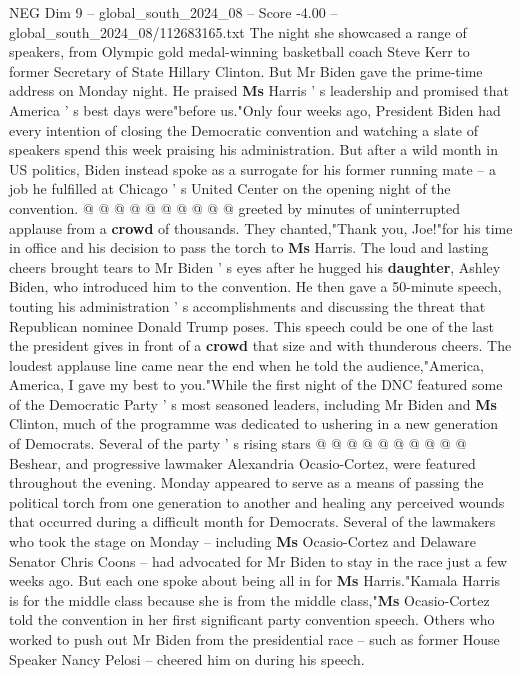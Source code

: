 \begin{textsample}{NEG Dim 9 – global\_south\_2024\_08 – Score -4.00 – global\_south\_2024\_08/112683165.txt}
The night she showcased a range of speakers, from Olympic gold medal-winning basketball coach Steve Kerr to former Secretary of State Hillary Clinton.
But Mr Biden gave the prime-time address on Monday night.
He praised \textbf{Ms} Harris ' s leadership and promised that America ' s best days were"before us."Only four weeks ago, President Biden had every intention of closing the Democratic convention and watching a slate of speakers spend this week praising his administration.
But after a wild month in US politics, Biden instead spoke as a surrogate for his former running mate -- a job he fulfilled at Chicago ' s United Center on the opening night of the convention. @ @ @ @ @ @ @ @ @ @ greeted by minutes of uninterrupted applause from a \textbf{crowd} of thousands.
They chanted,"Thank you, Joe!"for his time in office and his decision to pass the torch to \textbf{Ms} Harris.
The loud and lasting cheers brought tears to Mr Biden ' s eyes after he hugged his \textbf{daughter}, Ashley Biden, who introduced him to the convention.
He then gave a 50-minute speech, touting his administration ' s accomplishments and discussing the threat that Republican nominee Donald Trump poses.
This speech could be one of the last the president gives in front of a \textbf{crowd} that size and with thunderous cheers.
The loudest applause line came near the end when he told the audience,"America, America, I gave my best to you."While the first night of the DNC featured some of the Democratic Party ' s most seasoned leaders, including Mr Biden and \textbf{Ms} Clinton, much of the programme was dedicated to ushering in a new generation of Democrats.
Several of the party ' s rising stars @ @ @ @ @ @ @ @ @ @ Beshear, and progressive lawmaker Alexandria Ocasio-Cortez, were featured throughout the evening.
Monday appeared to serve as a means of passing the political torch from one generation to another and healing any perceived wounds that occurred during a difficult month for Democrats.
Several of the lawmakers who took the stage on Monday -- including \textbf{Ms} Ocasio-Cortez and Delaware Senator Chris Coons -- had advocated for Mr Biden to stay in the race just a few weeks ago.
But each one spoke about being all in for \textbf{Ms} Harris."Kamala Harris is for the middle class because she is from the middle class,"\textbf{Ms} Ocasio-Cortez told the convention in her first significant party convention speech.
Others who worked to push out Mr Biden from the presidential race -- such as former House Speaker Nancy Pelosi -- cheered him on during his speech.

\end{textsample}
